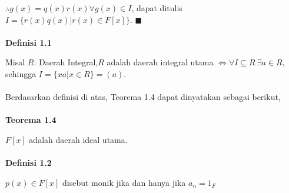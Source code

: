  $\therefore g(x)=q(x)r(x) \forall g(x) \in I$, dapat ditulis $I=\{r(x)q(x)|r(x) \in F[x]\}.$ $\blacksquare$
\\ \\
\textbf{Definisi 1.1}
\par Misal $R$: Daerah Integral,$R$ adalah daerah integral utama $\iff \forall I \subseteq R~\exists a \in R$, sehingga $I=\{xa|x \in R\}=(a).$
\\ \\
Berdasarkan definisi di atas, Teorema 1.4 dapat dinyatakan sebagai berikut,
\\ \\
\textbf{Teorema 1.4}
\par $F[x]$ adalah daerah ideal utama.
\\ \\
\textbf{Definisi 1.2}
 \par $p(x) \in F[x]$ disebut monik jika dan hanya jika $a_n=1_F$
